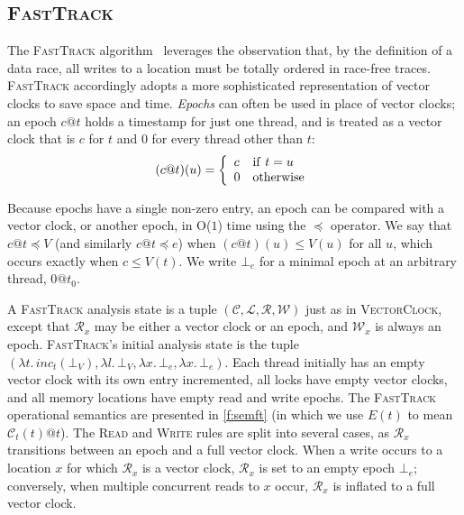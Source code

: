 \documentclass[preprint, 9pt]{sigplanconf}
\newcommand{\VCalg}{\textsc{VectorClock}\xspace}
\newcommand{\FT}{\textsc{FastTrack}\xspace}
\newcommand{\Constant}{O($1$)\xspace}
\newcommand{\Rule}[1]{\textsc{#1}}
\newcommand{\EpochCompare}{\preceq}
\begin{document}
\subsection{\FT}


The \FT algorithm~\cite{fasttrack} leverages the observation that, by the definition of a data race, all writes to a location must be totally ordered in race-free traces. \FT accordingly adopts a more sophisticated representation of vector clocks to save space and time.
\emph{Epochs} can often be used in place of vector clocks; an epoch $c@t$  holds a timestamp for just one thread, and is treated as a vector clock that is $c$ for $t$ and 0 for every thread other than $t$:
\[
(c@t)(u) = 
\left\{
  \begin{array}[c]{ll}
   c & \mathrm{if}\ t = u \\
   0 & \mathrm{otherwise}
  \end{array}
  \right.
\]

Because epochs have a single non-zero entry, an epoch can be compared with a vector clock, or another epoch, in \Constant time using the $\EpochCompare$ operator. We say that $c@t \EpochCompare V$ (and similarly $c@t \EpochCompare e$) when $(c@t)(u) \leq V(u)$ for all $u$, which occurs exactly when $c \le V(t)$.
We write $\bot_e$ for a minimal epoch at an arbitrary thread, $0@t_0$.

A \FT analysis state is a tuple $(\mathcal{C}, \mathcal{L}, \mathcal{R}, \mathcal{W})$ just as in \VCalg, except that $\mathcal{R}_x$ may be either a vector clock or an epoch, and $\mathcal{W}_x$ is always an epoch. \FT's initial analysis state is the tuple $(\lambda t.\,\mathit{inc}_t(\bot_V), \lambda l.\,\bot_V , \lambda x.\, \bot_e, \lambda x.\, \bot_e)$. Each thread initially has an empty vector clock with its own entry incremented, all locks have empty vector clocks, and all memory locations have empty read and write epochs. The \FT operational semantics are presented in \autoref{f:semft} (in which we use $E(t)$ to mean $\mathcal{C}_t(t)@t$). The \Rule{Read} and \Rule{Write} rules are split into several cases, as $\mathcal{R}_x$ transitions between an epoch and a full vector clock. When a write occurs to a location $x$ for which $\mathcal{R}_x$ is a vector clock, $\mathcal{R}_x$ is set to an empty epoch $\bot_e$; conversely, when multiple concurrent reads to $x$ occur, $\mathcal{R}_x$ is inflated to a full vector clock.
\end{document}
